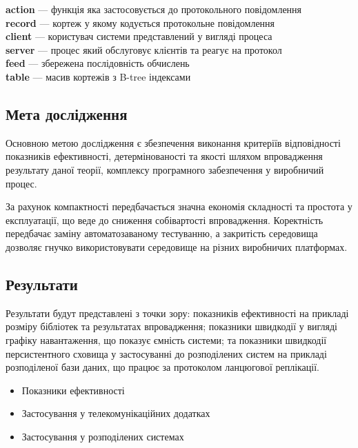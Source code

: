 \documentclass[11pt,oneside]{article}
\begin{document}
{\bf action} --- функція яка застосовується до протокольного повідомлення\\
{\bf record} --- кортеж у якому кодується протокольне повідомлення\\
{\bf client} --- користувач системи представлений у вигляді процеса\\
{\bf server} --- процес який обслуговує клієнтів та реагує на протокол\\
{\bf feed}   --- збережена послідовність обчислень\\
{\bf table}  --- масив кортежів з B-tree індексами\\

\newpage

\subsection{Мета дослідження}
\vspace{0.5cm}
   Основною метою дослідження є збезпечення виконання критеріїв відповідності
   показників ефективності, детермінованості та якості шляхом впровадження
   результату даної теорії, комплексу програмного забезпечення у виробничий процес.

   За рахунок компактності передбачається значна економія складності та простота у експлуатації,
   що веде до сниження собівартості впровадження. Коректність передбачає заміну
   автоматозаваному тестуванню, а закритість середовища дозволяє гнучко використовувати
   середовище на різних виробничих платформах.
   \\

\subsection{Результати}
\vspace{0.5cm}
   Результати будут представлені з точки зору: показників ефективності на
   прикладі розміру бібліотек та результатах впровадження; показники швидкодії
   у вигляді графіку навантаження, що показує ємність системи; та показники
   швидкодії персистентного сховища у застосуванні до розподілених систем на
   прикладі розподіленої бази даних, що працює за протоколом ланцюгової реплікації.

\begin{itemize}
   \item Показники ефективності
   \item Застосування у телекомунікаційних додатках
   \item Застосування у розподілених системах
\end{itemize}
\end{document}
